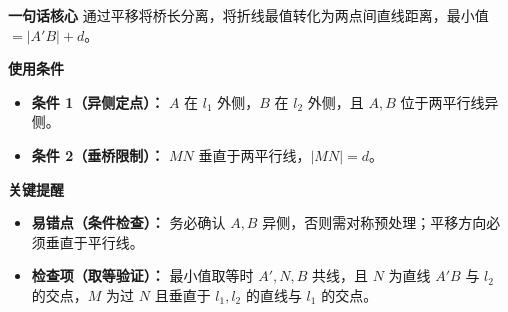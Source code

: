 \begin{summarybox}
	\textbf{\textcolor{CSummary}{一句话核心}}
	通过平移将桥长分离，将折线最值转化为两点间直线距离，最小值 $=|A'B|+d$。

	\medskip
	\textbf{\textcolor{CSummary}{使用条件}}
	\begin{itemize}[leftmargin=*, itemsep=0.5em, topsep=0.4em]
		\item \textbf{条件 1（异侧定点）：} $A$ 在 $l_1$ 外侧，$B$ 在 $l_2$ 外侧，且 $A,B$ 位于两平行线异侧。
		\item \textbf{条件 2（垂桥限制）：} $MN$ 垂直于两平行线，$|MN|=d$。
	\end{itemize}

	\medskip
	\textbf{\textcolor{CSummary}{关键提醒}}
	\begin{itemize}[leftmargin=*, itemsep=0.5em, topsep=0.4em]
		\item \textbf{易错点（条件检查）：} 务必确认 $A,B$ 异侧，否则需对称预处理；平移方向必须垂直于平行线。
		\item \textbf{检查项（取等验证）：} 最小值取等时 $A',N,B$ 共线，且 $N$ 为直线 $A'B$ 与 $l_2$ 的交点，$M$ 为过 $N$ 且垂直于 $l_1,l_2$ 的直线与 $l_1$ 的交点。
	\end{itemize}

\end{summarybox}
